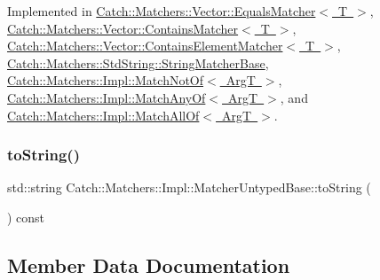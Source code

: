 Implemented in \mbox{\hyperlink{struct_catch_1_1_matchers_1_1_vector_1_1_equals_matcher_aca79ade26f4a75b2a57005067e086e35}{Catch\+::\+Matchers\+::\+Vector\+::\+Equals\+Matcher$<$ T $>$}}, \mbox{\hyperlink{struct_catch_1_1_matchers_1_1_vector_1_1_contains_matcher_add1a31f049cec89f980424ecdb7027ac}{Catch\+::\+Matchers\+::\+Vector\+::\+Contains\+Matcher$<$ T $>$}}, \mbox{\hyperlink{struct_catch_1_1_matchers_1_1_vector_1_1_contains_element_matcher_a5a869772714dd045816707b74b217664}{Catch\+::\+Matchers\+::\+Vector\+::\+Contains\+Element\+Matcher$<$ T $>$}}, \mbox{\hyperlink{struct_catch_1_1_matchers_1_1_std_string_1_1_string_matcher_base_a9d15cfb882efbea778b2ed29e7f48f37}{Catch\+::\+Matchers\+::\+Std\+String\+::\+String\+Matcher\+Base}}, \mbox{\hyperlink{struct_catch_1_1_matchers_1_1_impl_1_1_match_not_of_a62bdc7dcb9ff000438a4ed3d5483a248}{Catch\+::\+Matchers\+::\+Impl\+::\+Match\+Not\+Of$<$ Arg\+T $>$}}, \mbox{\hyperlink{struct_catch_1_1_matchers_1_1_impl_1_1_match_any_of_a020f5d7889d8cd8be9ad309c690147b6}{Catch\+::\+Matchers\+::\+Impl\+::\+Match\+Any\+Of$<$ Arg\+T $>$}}, and \mbox{\hyperlink{struct_catch_1_1_matchers_1_1_impl_1_1_match_all_of_aaefeba99a0b35425203468a65bff544b}{Catch\+::\+Matchers\+::\+Impl\+::\+Match\+All\+Of$<$ Arg\+T $>$}}.

\mbox{\label{class_catch_1_1_matchers_1_1_impl_1_1_matcher_untyped_base_a5982c7c80ca71dfe2298babadad7a453}} 
\subsubsection{\texorpdfstring{to\+String()}{toString()}}
{\footnotesize\ttfamily std\+::string Catch\+::\+Matchers\+::\+Impl\+::\+Matcher\+Untyped\+Base\+::to\+String (\begin{DoxyParamCaption}{ }\end{DoxyParamCaption}) const\hspace{0.3cm}{\ttfamily [inline]}}



\subsection{Member Data Documentation}
\mbox{\label{class_catch_1_1_matchers_1_1_impl_1_1_matcher_untyped_base_a951095c462657e7097a9a6dc4dde813f}} 

